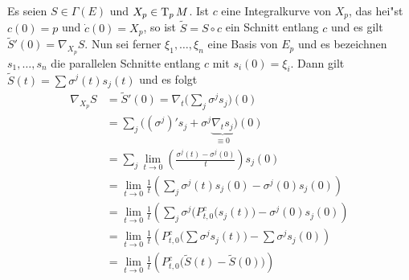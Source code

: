 Es seien $S \in \Gamma(E)$ und $X_p \in \operatorname{T}_pM$. Ist $c$ eine Integralkurve von $X_p$, das hei"st $c(0) = p$ und $\dot c(0) = X_p$, so ist $\tilde S = S \circ c$ ein Schnitt entlang $c$ und es gilt $\tilde S'(0) = \nabla_{X_p} S$. Nun sei ferner $\xi_1,\ldots ,\xi_n$ eine Basis von $E_p$ und es bezeichnen $s_1,\ldots ,s_n$ die parallelen Schnitte  entlang $c$ mit $s_i(0) = \xi_i$. Dann gilt $\tilde S(t) = \sum \sigma^j(t)s_j(t)$ und es folgt
\begin{align*}
	\nabla_{X_p}S &= \tilde S'(0) = \nabla_t \big( \sum_j \sigma^j s_j \big)(0)\\
	&= \sum_j \big( (\sigma^j)' s_j + \sigma^j \underbrace{\nabla_t s_j}_{\equiv 0} \big) (0)\\
	&= \sum_j \lim_{t \to 0} \left( \frac{\sigma^j(t) - \sigma^j(0)}{t} \right) s_j(0)\\
	&= \lim_{t \to 0} \frac{1}{t} \left( \sum_j \sigma^j(t) s_j(0) - \sigma^j(0) s_j(0) \right)\\
	&= \lim_{t \to 0} \frac{1}{t} \left( \sum_j \sigma^j \big(P_{t,0}^c (s_j(t) \big) - \sigma^j(0) s_j(0) \right)\\
	&= \lim_{t \to 0} \frac{1}{t} \left( P_{t,0}^c \big( \sum \sigma^j s_j(t) \big) - \sum \sigma^j s_j(0) \right)\\
	&= \lim_{t \to 0} \frac{1}{t} \left( P_{t,0}^c \big( \tilde S(t) - \tilde S(0) \big) \right)
\end{align*}
